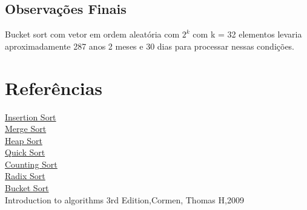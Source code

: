 \documentclass[12pt,a4paper,twoside]{report}
\begin{document}
\section{Observações Finais}
Bucket sort com vetor em ordem aleatória com $2^k$ com k = 32 elementos levaria aproximadamente 287 anos 2 meses e 30 dias para processar nessas condições.

%
%

\chapter{Referências}
\href{https://pt.wikipedia.org/wiki/Insertion_sort}{Insertion Sort}\\
\href{https://pt.wikipedia.org/wiki/Merge_sort}{Merge Sort}\\
\href{https://pt.wikipedia.org/wiki/Heapsort}{Heap Sort}\\
\href{https://en.wikipedia.org/wiki/Quicksort}{Quick Sort}\\
\href{https://pt.wikipedia.org/wiki/Counting_sort}{Counting Sort}\\
\href{https://en.wikipedia.org/wiki/Radix_sort}{Radix Sort}\\
\href{https://en.wikipedia.org/wiki/Bucket_sort}{Bucket Sort}\\
Introduction to algorithms 3rd Edition,Cormen, Thomas H,2009
  
\end{document}
